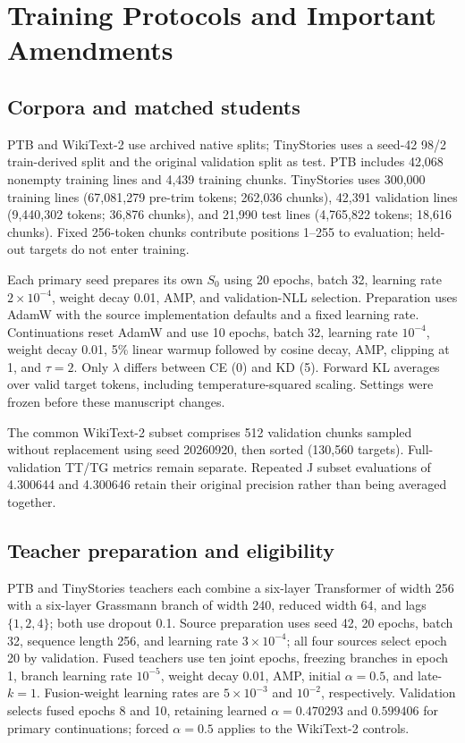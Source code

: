 \section{Training Protocols and Important Amendments}\label{app:protocols}

\subsection{Corpora and matched students}
PTB and WikiText-2 use archived native splits; TinyStories uses a seed-42 98/2 train-derived split and the original validation split as test. PTB includes 42,068 nonempty training lines and 4,439 training chunks. TinyStories uses 300,000 training lines (67,081,279 pre-trim tokens; 262,036 chunks), 42,391 validation lines (9,440,302 tokens; 36,876 chunks), and 21,990 test lines (4,765,822 tokens; 18,616 chunks). Fixed 256-token chunks contribute positions 1--255 to evaluation; held-out targets do not enter training.

Each primary seed prepares its own $S_0$ using 20 epochs, batch 32, learning rate $2\times10^{-4}$, weight decay 0.01, AMP, and validation-NLL selection. Preparation uses AdamW with the source implementation defaults and a fixed learning rate. Continuations reset AdamW and use 10 epochs, batch 32, learning rate $10^{-4}$, weight decay 0.01, 5\% linear warmup followed by cosine decay, AMP, clipping at 1, and $\tau=2$. Only $\lambda$ differs between CE (0) and KD (5). Forward KL averages over valid target tokens, including temperature-squared scaling. Settings were frozen before these manuscript changes.

The common WikiText-2 subset comprises 512 validation chunks sampled without replacement using seed 20260920, then sorted (130,560 targets). Full-validation TT/TG metrics remain separate. Repeated J subset evaluations of 4.300644 and 4.300646 retain their original precision rather than being averaged together.

\subsection{Teacher preparation and eligibility}
PTB and TinyStories teachers each combine a six-layer Transformer of width 256 with a six-layer Grassmann branch of width 240, reduced width 64, and lags $\{1,2,4\}$; both use dropout 0.1. Source preparation uses seed 42, 20 epochs, batch 32, sequence length 256, and learning rate $3\times10^{-4}$; all four sources select epoch 20 by validation. Fused teachers use ten joint epochs, freezing branches in epoch 1, branch learning rate $10^{-5}$, weight decay 0.01, AMP, initial $\alpha=0.5$, and late-$k=1$. Fusion-weight learning rates are $5\times10^{-3}$ and $10^{-2}$, respectively. Validation selects fused epochs 8 and 10, retaining learned $\alpha=0.470293$ and $0.599406$ for primary continuations; forced $\alpha=0.5$ applies to the WikiText-2 controls.

